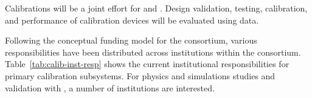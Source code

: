 


Calibrations %
will be a joint effort for \single and \dual. Design validation, testing, calibration, and performance of calibration devices will be evaluated using  data.

Following the conceptual funding model for the consortium, various responsibilities have been distributed across institutions within the consortium. 
Table~\ref{tab:calib-inst-resp} shows the current institutional responsibilities for primary calibration subsystems. 
For physics and simulations studies and validation with , a number of institutions are interested. 


\begin{comment}
\begin{dunetable}
[Institutional responsibility for calibrations]
{p{0.25\textwidth}p{0.65\textwidth}}
{tab:calib-inst-resp}
{Institutional responsibilities in the Calibration Consortium}   
System & Institutional Responsibility \\ \toprowrule
Laser System & Bern, Hawaii, LIP, Pitt, UTK \\ \colhline
Pulsed Neutron Source & LANL, BU, CSU, UC Davis, Iowa, LIP, MSU, SDSMT \\ 
\end{dunetable}
\end{comment}

